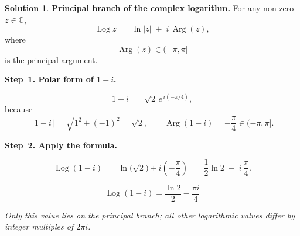 \documentclass[12pt]{article}
\DeclareMathOperator{\Log}{Log}
\DeclareMathOperator{\Arg}{Arg}
\theoremstyle{definition} %
\newtheorem{solution}{Solution}
\theoremstyle{plain} %
\begin{document}
    \begin{solution}
      \textbf{Principal branch of the complex logarithm.}
      For any non‑zero \(z\in\mathbb{C}\),
      \[
         \Log z \;=\; \ln|z| \;+\; i\,\Arg(z),
      \]
      where
      \[
         \Arg(z)\in(-\pi,\pi]
      \]
      is the principal argument.
      
      \bigskip
      \textbf{Step 1.  Polar form of \(1-i\).}
      
      \[
         1-i \;=\; \sqrt2\,e^{\,i(-\pi/4)},
      \]
      because
      \[
         |\,1-i\,|=\sqrt{1^2+(-1)^2}=\sqrt2,
         \qquad
         \Arg(1-i)=-\frac{\pi}{4}\in(-\pi,\pi].
      \]
      
      \bigskip
      \textbf{Step 2.  Apply the formula.}
      
      \[
         \Log(1-i)
         \;=\;
         \ln\!\bigl(\sqrt2\bigr)
         + i\!\left(-\frac{\pi}{4}\right)
         \;=\;
         \frac{1}{2}\ln 2 \;-\; i\,\frac{\pi}{4}.
      \]
      
      \[
      \boxed{\displaystyle
         \Log(1-i)=\frac{\ln 2}{2}-\frac{\pi i}{4}}
      \]
      
      \medskip
      \textit{Only this value lies on the principal branch; all other logarithmic
      values differ by integer multiples of \(2\pi i\).}
      \end{solution}
\end{document}

